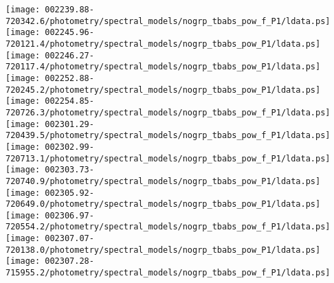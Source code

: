 \documentclass{aastex}
\begin{document}
\begin{figure*}[!ht]
\centering
\texttt{[image: 002239.88-720342.6/photometry/spectral\_models/nogrp\_tbabs\_pow\_f\_P1/ldata.ps]} \hfill 
\texttt{[image: 002245.96-720121.4/photometry/spectral\_models/nogrp\_tbabs\_pow\_P1/ldata.ps]} \hfill 
\texttt{[image: 002246.27-720117.4/photometry/spectral\_models/nogrp\_tbabs\_pow\_P1/ldata.ps]} \\ 
\vspace*{0.5in}
\texttt{[image: 002252.88-720245.2/photometry/spectral\_models/nogrp\_tbabs\_pow\_P1/ldata.ps]} \hfill 
\texttt{[image: 002254.85-720726.3/photometry/spectral\_models/nogrp\_tbabs\_pow\_f\_P1/ldata.ps]} \hfill 
\texttt{[image: 002301.29-720439.5/photometry/spectral\_models/nogrp\_tbabs\_pow\_f\_P1/ldata.ps]} \\ 
\vspace*{0.5in}
\texttt{[image: 002302.99-720713.1/photometry/spectral\_models/nogrp\_tbabs\_pow\_f\_P1/ldata.ps]} \hfill 
\texttt{[image: 002303.73-720740.9/photometry/spectral\_models/nogrp\_tbabs\_pow\_P1/ldata.ps]} \hfill 
\texttt{[image: 002305.92-720649.0/photometry/spectral\_models/nogrp\_tbabs\_pow\_P1/ldata.ps]} \\ 
\vspace*{0.5in}
\texttt{[image: 002306.97-720554.2/photometry/spectral\_models/nogrp\_tbabs\_pow\_f\_P1/ldata.ps]} \hfill 
\texttt{[image: 002307.07-720138.0/photometry/spectral\_models/nogrp\_tbabs\_pow\_P1/ldata.ps]} \hfill 
\texttt{[image: 002307.28-715955.2/photometry/spectral\_models/nogrp\_tbabs\_pow\_f\_P1/ldata.ps]} \\ 
\vspace*{0.5in}
\end{figure*}
\clearpage
\end{document}
